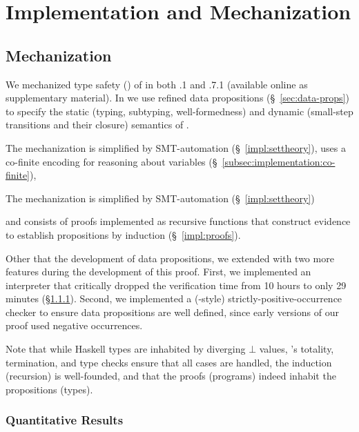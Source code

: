 \chapter{Implementation and Mechanization}
\label{ch:implementation}

\section{\lh Mechanization}

We mechanized type safety () 
of \sysrf in both .1 and .7.1
(available online as supplementary
material).
%
In \lh we use refined data propositions 
(\S~\ref{sec:data-props}) to specify the
static (\eg typing, subtyping, well-formedness)
and dynamic (\ie small-step transitions and their closure)
semantics of \sysrf.
%
\begin{fullversion}
  The \lh mechanization is simplified by 
  SMT-automation (\S~\ref{impl:settheory}),
  uses a co-finite encoding for reasoning about
  variables (\S~\ref{subsec:implementation:co-finite}),
\end{fullversion}
\begin{conference}
  The \lh mechanization is simplified by 
  SMT-automation (\S~\ref{impl:settheory})
\end{conference}
and consists of proofs implemented as recursive functions that
construct  evidence to establish propositions by
induction (\S~\ref{impl:proofs}).
%


  Other that the development of data propositions, we extended \lh 
  with two more features during the development of this proof. 
  First, we implemented an interpreter that 
  critically dropped the verification time from 10 hours 
  to only 29 minutes (\S\ref{subsec:quantitiative}). 
  Second, we implemented a (\coq-style) strictly-positive-occurrence checker
  to ensure data propositions are well defined, 
  since early versions of our proof used negative occurrences. 

%
Note that while Haskell types are inhabited
by diverging $\bot$ values, \lh's totality,
termination, and type checks ensure that all
cases are handled, the induction (recursion)
is well-founded, and that the proofs (programs)
indeed inhabit the propositions (types).



\subsection{Quantitative Results}
\label{subsec:quantitiative}


